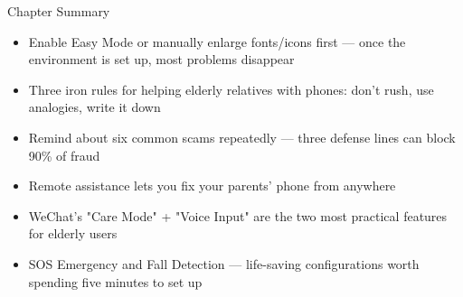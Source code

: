 \begin{tcbsummary}{Chapter Summary}
\begin{itemize}
  \item Enable Easy Mode or manually enlarge fonts/icons first — once the environment is set up, most problems disappear
  \item Three iron rules for helping elderly relatives with phones: don't rush, use analogies, write it down
  \item Remind about six common scams repeatedly — three defense lines can block 90\% of fraud
  \item Remote assistance lets you fix your parents' phone from anywhere
  \item WeChat's "Care Mode" + "Voice Input" are the two most practical features for elderly users
  \item SOS Emergency and Fall Detection — life-saving configurations worth spending five minutes to set up
\end{itemize}

\end{tcbsummary}
